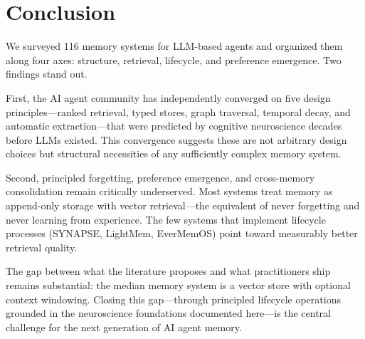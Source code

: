 \section{Conclusion}
\label{sec:conclusion}

We surveyed 116 memory systems for LLM-based agents and organized
them along four axes: structure, retrieval, lifecycle, and preference
emergence. Two findings stand out.

First, the AI agent community has independently converged on five
design principles---ranked retrieval, typed stores, graph traversal,
temporal decay, and automatic extraction---that were predicted by
cognitive neuroscience decades before LLMs existed. This convergence
suggests these are not arbitrary design choices but structural
necessities of any sufficiently complex memory system.

Second, principled forgetting, preference emergence, and cross-memory
consolidation remain critically underserved. Most systems treat memory
as append-only storage with vector retrieval---the equivalent of
never forgetting and never learning from experience. The few systems
that implement lifecycle processes (SYNAPSE, LightMem, EverMemOS) point
toward measurably better retrieval quality.

The gap between what the literature proposes and what practitioners
ship remains substantial: the median memory system is a vector store
with optional context windowing. Closing this gap---through principled
lifecycle operations grounded in the neuroscience foundations
documented here---is the central challenge for the next generation of
AI agent memory.
